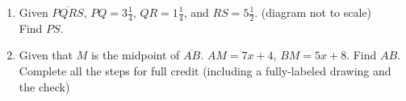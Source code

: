 \documentclass[12pt, twoside]{article}
\begin{document}
\begin{enumerate}
\item Given $\overline{PQRS}$, $PQ=3 \frac{1}{4}$, $QR=1 \frac{1}{4}$, and $RS= 5 \frac{1}{2}$. (diagram not to scale)\\ [0.25cm]
  Find ${PS}$.\\[.5in]
      \vspace{3cm}

\item Given that $M$ is the midpoint of $\overline{AB}$. $AM=7x+4$, $BM=5x+8$. Find ${AB}$.\\
Complete all the steps for full credit (including a fully-labeled drawing and the check)

\end{enumerate}
\end{document}
